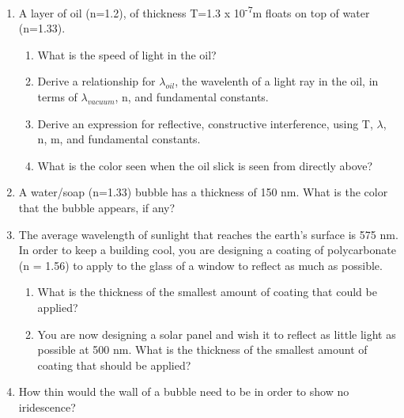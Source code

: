 \documentclass[letterpaper, 12pt]{article}
\begin{document}
\begin{enumerate}

\item A layer of oil (n=1.2), of thickness T=1.3 x 10\textsuperscript{-7}m  floats on top of water (n=1.33).
	\begin{enumerate}
		\item What is the speed of light in the oil?
		\vspace{1 in}
		\item Derive a relationship for $\lambda_{oil}$, the wavelenth of a light ray in the oil, in terms of $\lambda_{vacuum}$, n, and fundamental constants.  
		\vspace{1 in}
		\item Derive an expression for reflective, constructive interference, using T, $\lambda$, n, m, and fundamental constants.
		\vspace{1 in}
		\item What is the color seen when the oil slick is seen from directly above?
		\vspace{1 in}
	\end{enumerate}
\item A water/soap (n=1.33) bubble has a thickness of 150 nm.  What is the color that the bubble appears, if any?
	\vspace{1 in}
\item The average wavelength of sunlight that reaches the earth’s surface is 575 nm.  In order to keep a building cool, you are designing a coating of polycarbonate (n = 1.56) to apply to the glass of a window to reflect as much as possible.  
\begin{enumerate}
	\item What is the thickness of the smallest amount of coating that could be applied?
	\vspace{2in}
	\item You are now designing a solar panel and wish it to reflect as little light as possible at 500 nm.  What is the thickness of the smallest amount of coating that should be applied?
	
	
\end{enumerate}

\vspace {2in}
\item How thin would the wall of a bubble need to be in order to show no iridescence?



	
\end{enumerate}
 
\end{document}
